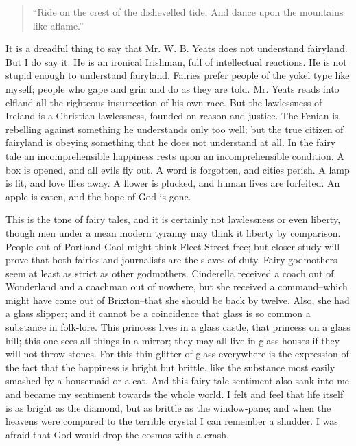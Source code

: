 \documentclass{book}
\newenvironment{mdblockquote}{%
  \begin{quotation}
    \itshape
}{%
  \end{quotation}
}
\begin{document}
\begin{mdblockquote}
“Ride on the crest of the dishevelled tide, And dance upon the mountains like aflame.”


\end{mdblockquote}
It is a dreadful thing to say that Mr. W. B. Yeats does not understand fairyland. But I do say it. He is an ironical Irishman, full of intellectual reactions. He is not stupid enough to understand fairyland. Fairies prefer people of the yokel type like myself; people who gape and grin and do as they are told. Mr. Yeats reads into elfland all the righteous insurrection of his own race. But the lawlessness of Ireland is a Christian lawlessness, founded on reason and justice. The Fenian is rebelling against something he understands only too well; but the true citizen of fairyland is obeying something that he does not understand at all. In the fairy tale an incomprehensible happiness rests upon an incomprehensible condition. A box is opened, and all evils fly out. A word is forgotten, and cities perish. A lamp is lit, and love flies away. A flower is plucked, and human lives are forfeited. An apple is eaten, and the hope of God is gone.

This is the tone of fairy tales, and it is certainly not lawlessness or even liberty, though men under a mean modern tyranny may think it liberty by comparison. People out of Portland Gaol might think Fleet Street free; but closer study will prove that both fairies and journalists are the slaves of duty. Fairy godmothers seem at least as strict as other godmothers. Cinderella received a coach out of Wonderland and a coachman out of nowhere, but she received a command–which might have come out of Brixton–that she should be back by twelve. Also, she had a glass slipper; and it cannot be a coincidence that glass is so common a substance in folk-lore. This princess lives in a glass castle, that princess on a glass hill; this one sees all things in a mirror; they may all live in glass houses if they will not throw stones. For this thin glitter of glass everywhere is the expression of the fact that the happiness is bright but brittle, like the substance most easily smashed by a housemaid or a cat. And this fairy-tale sentiment also sank into me and became my sentiment towards the whole world. I felt and feel that life itself is as bright as the diamond, but as brittle as the window-pane; and when the heavens were compared to the terrible crystal I can remember a shudder. I was afraid that God would drop the cosmos with a crash.
\end{document}
